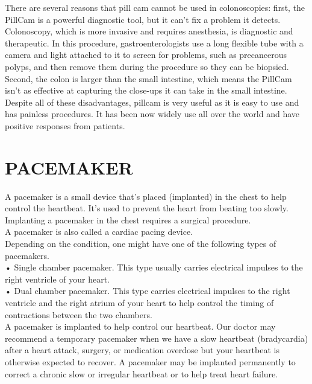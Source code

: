\documentclass[12pt]{article}
\begin{document}
There are several reasons that pill cam cannot be used in colonoscopies: first, the PillCam is a powerful diagnostic tool, but it can’t fix a problem it detects. Colonoscopy, which is more invasive and requires anesthesia, is diagnostic and therapeutic.
In this procedure, gastroenterologists use a long flexible tube with a camera and light attached to it to screen for problems, such as precancerous polyps, and then remove them during the procedure so they can be biopsied.
Second, the colon is larger than the small intestine, which means the PillCam isn’t as effective at capturing the close-ups it can take in the small intestine.
\\
Despite all of these disadvantages, pillcam is very useful as it is easy to use and has painless procedures. It has been now widely use all over the world and have positive responses from patients. 

\newpage

\section{PACEMAKER}

A pacemaker is a small device that's placed (implanted) in the chest to help control the heartbeat. It's used to prevent the heart from beating too slowly. Implanting a pacemaker in the chest requires a surgical procedure.
\\
A pacemaker is also called a cardiac pacing device.
\\
Depending on the condition, one might have one of the following types of pacemakers.\\
•	Single chamber pacemaker. This type usually carries electrical impulses to the right ventricle of your heart.
\\
•	Dual chamber pacemaker. This type carries electrical impulses to the right ventricle and the right atrium of your heart to help control the timing of contractions between the two chambers.
\\
A pacemaker is implanted to help control our heartbeat. Our doctor may recommend a temporary pacemaker when we have a slow heartbeat (bradycardia) after a heart attack, surgery, or medication overdose but your heartbeat is otherwise expected to recover. A pacemaker may be implanted permanently to correct a chronic slow or irregular heartbeat or to help treat heart failure.
\\
\end{document}
